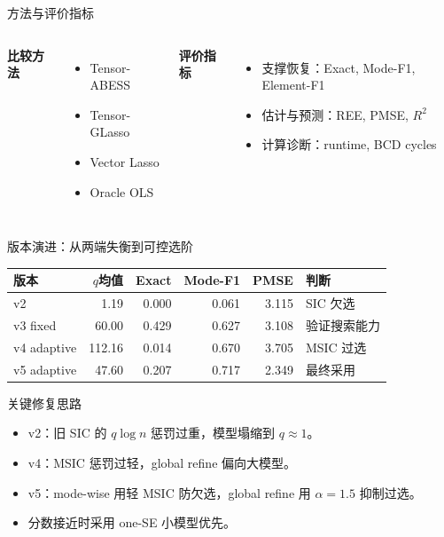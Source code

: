 \documentclass[11pt]{beamer}
\begin{document}
\begin{frame}{方法与评价指标}
\small
\begin{columns}
\textbf{比较方法}
\begin{itemize}
  \item Tensor-ABESS
  \item Tensor-GLasso
  \item Vector Lasso
  \item Oracle OLS
\end{itemize}
\textbf{评价指标}
\begin{itemize}
  \item 支撑恢复：Exact, Mode-F1, Element-F1
  \item 估计与预测：REE, PMSE, $R^2$
  \item 计算诊断：runtime, BCD cycles
\end{itemize}
\end{columns}
\end{frame}
\begin{frame}{版本演进：从两端失衡到可控选阶}
\small
\begin{tabular}{lrrrrl}
\toprule
版本 & $q$均值 & Exact & Mode-F1 & PMSE & 判断\\
\midrule
v2 & 1.19 & 0.000 & 0.061 & 3.115 & SIC 欠选\\
v3 fixed & 60.00 & 0.429 & 0.627 & 3.108 & 验证搜索能力\\
v4 adaptive & 112.16 & 0.014 & 0.670 & 3.705 & MSIC 过选\\
v5 adaptive & 47.60 & 0.207 & 0.717 & 2.349 & 最终采用\\
\bottomrule
\end{tabular}
\end{frame}
\begin{frame}{关键修复思路}
\begin{itemize}
  \item v2：旧 SIC 的 $q\log n$ 惩罚过重，模型塌缩到 $q\approx1$。
  \item v4：MSIC 惩罚过轻，global refine 偏向大模型。
  \item v5：mode-wise 用轻 MSIC 防欠选，global refine 用 $\alpha=1.5$ 抑制过选。
  \item 分数接近时采用 one-SE 小模型优先。
\end{itemize}
\end{frame}
\end{document}

